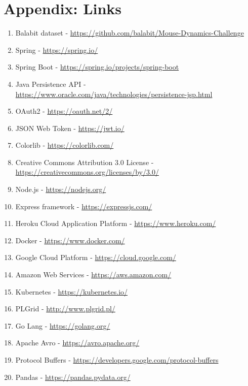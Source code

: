 \section*{Appendix: Links}\label{sec:links}
\begin{enumerate}
    \item Balabit dataset - \url{https://github.com/balabit/Mouse-Dynamics-Challenge}\label{itm:balabit}
    \item Spring - \url{https://spring.io/}\label{itm:spring}
    \item Spring Boot - \url{https://spring.io/projects/spring-boot}\label{itm:spring-boot}
    \item Java Persistence API - \url{https://www.oracle.com/java/technologies/persistence-jsp.html}\label{itm:jpa}
    \item OAuth2 - \url{https://oauth.net/2/}\label{itm:oauth2}
    \item JSON Web Token - \url{https://jwt.io/}\label{itm:jwt}
    \item Colorlib - \url{https://colorlib.com/}\label{itm:colorlib}
    \item Creative Commons Attribution 3.0 License - \url{https://creativecommons.org/licenses/by/3.0/}\label{itm:license}
    \item Node.js - \url{https://nodejs.org/}\label{itm:node}
    \item Express framework - \url{https://expressjs.com/}\label{itm:express}
    \item Heroku Cloud Application Platform - \url{https://www.heroku.com/}\label{itm:heroku}
    \item Docker - \url{https://www.docker.com/}\label{itm:docker}
    \item Google Cloud Platform - \url{https://cloud.google.com/}\label{itm:gcp}
    \item Amazon Web Services - \url{https://aws.amazon.com/}\label{itm:aws}
    \item Kubernetes - \url{https://kubernetes.io/}\label{itm:kubernetes}
    \item PLGrid - \url{http://www.plgrid.pl/}\label{itm:plgrid}
    \item Go Lang - \url{https://golang.org/}\label{itm:golang}
    \item Apache Avro - \url{https://avro.apache.org/}\label{itm:avro}
    \item Protocol Buffers - \url{https://developers.google.com/protocol-buffers}\label{itm:protobuf}
    \item Pandas - \url{https://pandas.pydata.org/}\label{itm:pandas}

\end{enumerate}
